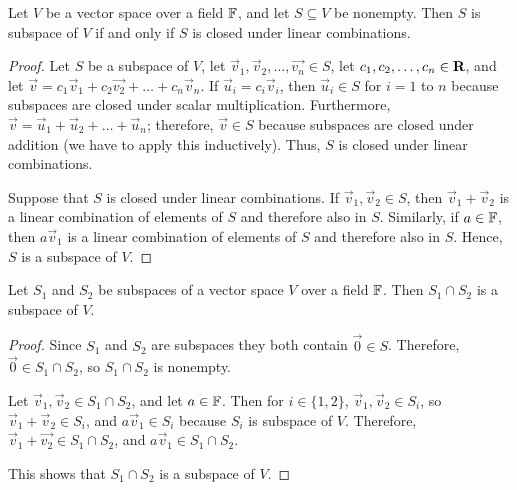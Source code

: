 \documentclass{homework}
\begin{document}
	\question Let $V$ be a vector space over a field $\mathbb{F}$, and let $S \subseteq V$ be nonempty. Then $S$ is subspace of $V$ if and only if $S$ is closed under linear combinations.
	\begin{proof}
		Let $S$ be a subspace of $V$, let $\vec{v}_1, \vec{v}_2, \dots, \vec{v_n} \in S$, let $c_1,c_2,\dots,c_n \in \textnormal{\bf R}$, and let $\vec{v} = c_1\vec{v}_1 + c_2\vec{v_2} + \dots + c_n\vec{v}_n$. If $\vec{u}_i = c_i\vec{v}_i$, then $\vec{u}_i \in S$ for $i=1$ to $n$ because subspaces are closed under scalar multiplication. Furthermore, $\vec{v} = \vec{u}_1+ \vec{u}_2 + \dots + \vec{u}_n$; therefore, $\vec{v} \in S$ because subspaces are closed under addition (we have to apply this inductively). Thus, $S$ is closed under linear combinations.
		
		Suppose that $S$ is closed under linear combinations. If $\vec{v}_1, \vec{v}_2 \in S$, then $\vec{v}_1 + \vec{v}_2$ is a linear combination of elements of $S$ and therefore also in $S$. Similarly, if $a \in \mathbb{F}$, then $a\vec{v}_1$ is a linear combination of elements of $S$ and therefore also in $S$. Hence, $S$ is a subspace of $V$.
	\end{proof}
	
	\question Let $S_1$ and $S_2$ be subspaces of a vector space $V$ over a field $\mathbb{F}$. Then $S_1 \cap S_2$ is a subspace of $V$.
	\begin{proof}
		Since $S_1$ and $S_2$ are subspaces they both contain $\vec{0} \in S$. Therefore, $\vec{0} \in S_1 \cap S_2$, so $S_1\cap S_2$ is nonempty.
		
		Let $\vec{v}_1, \vec{v}_2 \in S_1 \cap S_2$, and let $a \in \mathbb{F}$. Then for $i \in \{1,2\}$, $\vec{v}_1,\vec{v}_2\in S_i$, so $\vec{v}_1 + \vec{v}_2 \in S_i$, and $a\vec{v}_1 \in S_i$ because $S_i$ is subspace of $V$. Therefore, $\vec{v}_1 + \vec{v_2} \in S_1 \cap S_2$, and $a\vec{v}_1 \in S_1\cap S_2$.
		
		This shows that $S_1 \cap S_2$ is a subspace of $V$.
	\end{proof}
	
\end{document}
